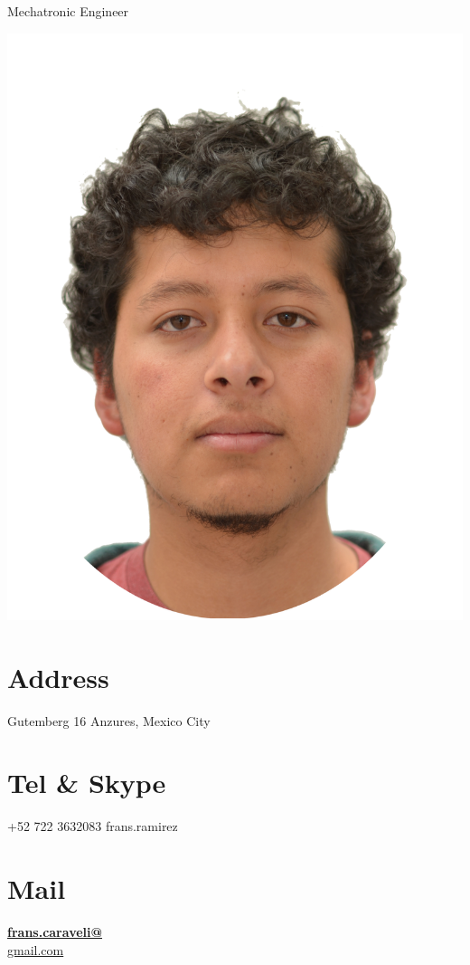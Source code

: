 \documentclass[]{friggeri-cv}
\begin{document}
      {Mechatronic Engineer}
      

\begin{aside}
  \includegraphics[scale=0.52]{img/Frans.png}
  \section{Address}
    Gutemberg 16
    Anzures, Mexico City
    ~
  \section{Tel \& Skype}
    +52 722 3632083
    frans.ramirez
    ~
  \section{Mail}
    \href{mailto:frans.caraveli@gmail.com}{\textbf{frans.caraveli@}\\gmail.com}
    ~

\end{aside}
\end{document}

